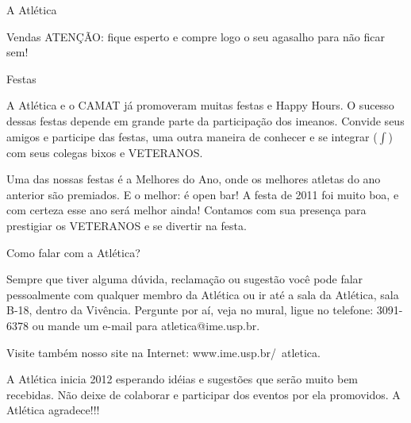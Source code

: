 \begin{secao}{A Atlética}
\begin{subsecao}{Vendas}
ATENÇÃO: fique esperto e compre logo o seu agasalho para não ficar sem!

  \end{subsecao}

\begin{subsecao}{Festas}

A Atlética e o CAMAT já promoveram muitas festas e Happy Hours. O sucesso dessas festas depende em grande parte da participação dos imeanos. Convide seus amigos e participe das festas, uma outra maneira de conhecer e se integrar ($\int$) com seus colegas bixos e VETERANOS.

Uma das nossas festas é a Melhores do Ano, onde os melhores atletas do ano anterior são premiados. E o melhor: é open bar! A festa de 2011 foi muito boa, e com certeza esse ano será melhor ainda! Contamos com sua presença para prestigiar os VETERANOS e se divertir na festa.

\end{subsecao}

\begin{subsecao}{Como falar com a Atlética?}


Sempre que tiver alguma dúvida, reclamação ou sugestão você pode falar pessoalmente com qualquer membro da Atlética ou ir até a sala da Atlética, sala B-18, dentro da Vivência. Pergunte por aí, veja no mural, ligue no telefone: 3091-6378 ou mande um e-mail para atletica@ime.usp.br.

Visite também nosso site na Internet: www.ime.usp.br/~atletica. 

A Atlética inicia 2012 esperando idéias e sugestões que serão muito bem recebidas. Não deixe de colaborar e participar dos eventos por ela promovidos. A Atlética agradece!!!

\end{subsecao}
\end{secao}
